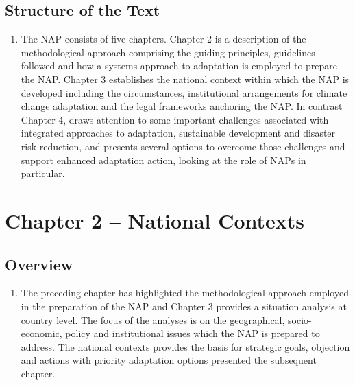 \documentclass[
]{book}
\providecommand{\tightlist}{%
  \setlength{\itemsep}{0pt}\setlength{\parskip}{0pt}}
\begin{document}
\hypertarget{structure-of-the-text}{%
\section{Structure of the Text}\label{structure-of-the-text}}

\begin{enumerate}
\def\labelenumi{\arabic{enumi}.}
\setcounter{enumi}{11}
\tightlist
\item
  The NAP consists of five chapters. Chapter 2 is a description of the methodological approach comprising the guiding principles, guidelines followed and how a systems approach to adaptation is employed to prepare the NAP. Chapter 3 establishes the national context within which the NAP is developed including the circumstances, institutional arrangements for climate change adaptation and the legal frameworks anchoring the NAP. In contrast Chapter 4, draws attention to some important challenges associated with integrated approaches to adaptation, sustainable development and disaster risk reduction, and presents several options to overcome those challenges and support enhanced adaptation action, looking at the role of NAPs in particular.
\end{enumerate}

\hypertarget{chapter-2-national-contexts}{%
\chapter{Chapter 2 -- National Contexts}\label{chapter-2-national-contexts}}

\hypertarget{overview}{%
\section{Overview}\label{overview}}

\begin{enumerate}
\def\labelenumi{\arabic{enumi}.}
\setcounter{enumi}{12}
\tightlist
\item
  The preceding chapter has highlighted the methodological approach employed in the preparation of the NAP and Chapter 3 provides a situation analysis at country level. The focus of the analyses is on the geographical, socio-economic, policy and institutional issues which the NAP is prepared to address. The national contexts provides the basis for strategic goals, objection and actions with priority adaptation options presented the subsequent chapter.
\end{enumerate}
\end{document}
